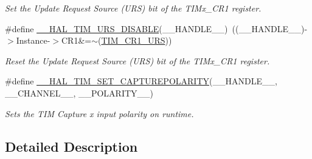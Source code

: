 \begin{DoxyCompactItemize}
\begin{DoxyCompactList}\small\item\em Set the Update Request Source (U\-R\-S) bit of the T\-I\-Mx\-\_\-\-C\-R1 register. \end{DoxyCompactList}\item 
\#define \hyperlink{group___t_i_m___exported___macros_gafacb551a4c537e62a0fe740b2f12236c}{\-\_\-\-\_\-\-H\-A\-L\-\_\-\-T\-I\-M\-\_\-\-U\-R\-S\-\_\-\-D\-I\-S\-A\-B\-L\-E}(\-\_\-\-\_\-\-H\-A\-N\-D\-L\-E\-\_\-\-\_\-)~((\-\_\-\-\_\-\-H\-A\-N\-D\-L\-E\-\_\-\-\_\-)-\/$>$Instance-\/$>$C\-R1\&=$\sim$(\hyperlink{group___peripheral___registers___bits___definition_ga06c997c2c23e8bef7ca07579762c113b}{T\-I\-M\-\_\-\-C\-R1\-\_\-\-U\-R\-S}))
\begin{DoxyCompactList}\small\item\em Reset the Update Request Source (U\-R\-S) bit of the T\-I\-Mx\-\_\-\-C\-R1 register. \end{DoxyCompactList}\item 
\#define \hyperlink{group___t_i_m___exported___macros_gac5d6989516caa67fae23a9329228cdc7}{\-\_\-\-\_\-\-H\-A\-L\-\_\-\-T\-I\-M\-\_\-\-S\-E\-T\-\_\-\-C\-A\-P\-T\-U\-R\-E\-P\-O\-L\-A\-R\-I\-T\-Y}(\-\_\-\-\_\-\-H\-A\-N\-D\-L\-E\-\_\-\-\_\-, \-\_\-\-\_\-\-C\-H\-A\-N\-N\-E\-L\-\_\-\-\_\-, \-\_\-\-\_\-\-P\-O\-L\-A\-R\-I\-T\-Y\-\_\-\-\_\-)
\begin{DoxyCompactList}\small\item\em Sets the T\-I\-M Capture x input polarity on runtime. \end{DoxyCompactList}\end{DoxyCompactItemize}


\subsection{Detailed Description}



